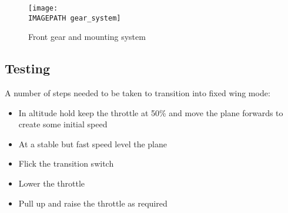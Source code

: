 \begin{figure}[!h]
	\centering
	\texttt{[image: \\IMAGEPATH gear\_system]}
	\caption{Front gear and mounting system}
	\label{fig:gearsys}
\end{figure}

\subsection{Testing}
A number of steps needed to be taken to transition into fixed wing mode: 
\begin{itemize}
\item In altitude hold keep the throttle at 50\% and move the plane forwards to create some initial speed
\item At a stable but fast speed level the plane
\item Flick the transition switch 
\item Lower the throttle
\item Pull up and raise the throttle as required
		
\end{itemize}

